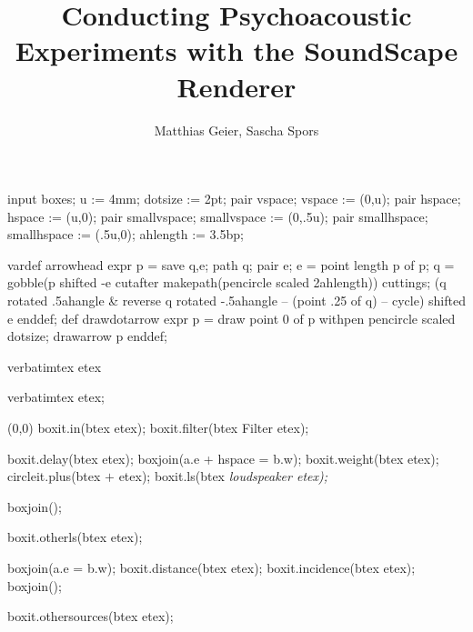 \documentclass[a4paper]{article}
\title{Conducting Psychoacoustic Experiments with the SoundScape Renderer}
\author{Matthias Geier, Sascha Spors}
\newcommand{\fontnormal}{\normalfont\footnotesize\sffamily}
\newcommand{\fontsmall}{\normalfont\scriptsize\sffamily\itshape}
\begin{document}
\begin{empfile}
\begin{empcmds}
  input boxes;
  u := 4mm;
  dotsize := 2pt;
  pair vspace; vspace := (0,u);
  pair hspace; hspace := (u,0);
  pair smallvspace; smallvspace := (0,.5u);
  pair smallhspace; smallhspace := (.5u,0);
  ahlength := 3.5bp; %

vardef arrowhead expr p =
  save q,e; path q; pair e;
  e = point length p of p;
  q = gobble(p shifted -e cutafter makepath(pencircle scaled 2ahlength))
  cuttings;
  (q rotated .5ahangle & reverse q rotated -.5ahangle -- (point .25 of q) --
  cycle)  shifted e
enddef;
def drawdotarrow expr p =
  draw point 0 of p withpen pencircle scaled dotsize;
  drawarrow p
enddef;

verbatimtex
\newcommand{\twolines}[2]{$\genfrac{}{}{0pt}{1}{\text{\itshape#1}}{\text{\itshape#2}}$}
etex

  verbatimtex \fontnormal etex;
\end{empcmds}
\begin{empdef}[wfs](0,0)
boxit.in(btex  etex);
boxit.filter(btex Filter etex);

boxit.delay(btex  etex);
boxjoin(a.e + hspace = b.w);
boxit.weight(btex  etex);
circleit.plus(btex $+$ etex);
boxit.ls(btex \fontsmall loudspeaker etex);

boxjoin();

boxit.otherls(btex  etex);

boxjoin(a.e = b.w);
boxit.distance(btex  etex);
boxit.incidence(btex  etex);
boxjoin();


boxit.othersources(btex  etex);


\end{empdef}
\end{empfile}
\end{document}
